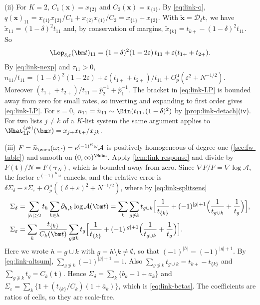 (ii) For $K=2$, $C_1(\bm x)=x_{\{2\}}$ and $C_2(\bm x)=x_{\{1\}}$. By \eqref{eq:link-q}, $q(\bm x)_{11}=x_{\{1\}}x_{\{2\}}/C_1+x_{\{2\}}x_{\{1\}}/C_2=x_{\{1\}}+x_{\{2\}}$. With $\tilde{\bm x}=\mathcal D_\delta\bm t$, we have $\tilde x_{11}=(1-\delta)^2t_{11}$ and, by conservation of margins, $\tilde x_{\{k\}}=t_{k+}-(1-\delta)^2t_{11}$. So
\[
  \Lop_{\delta,\varepsilon}(\bm t)_{11}=(1-\delta)^2(1-2\varepsilon)\,t_{11}+\varepsilon(t_{1+}+t_{2+}).
\]
By \eqref{eq:link-nexp} and $\tau_{11}>0$, $n_{11}/t_{11}=(1-\delta)^2(1-2\varepsilon)+\varepsilon(t_{1+}+t_{2+})/t_{11}+O_p^{\mathrm u}(\varepsilon^2+N^{-1/2})$. Moreover $(t_{1+}+t_{2+})/t_{11}=\hat p_2^{-1}+\hat p_1^{-1}$. The bracket in \eqref{eq:link-LP} is bounded away from zero for small rates, so inverting and expanding to first order gives \eqref{eq:link-LP}. For $\varepsilon=0$, $n_{11}=\tilde n_{11}\sim\Bin(t_{11},(1-\delta)^2)$ by \cref{prop:link-detach}(iv). For two lists $j\ne k$ of a $K$-list system the same argument applies to $\Nhat^{(jk)}_{\mathrm{LP}}(\bm x)=x_{j+}x_{k+}/x_{jk}$.

(iii) $F=\widehat n_{\zero}(\omega;\cdot)=e^{(-1)^K\omega}\mathcal A$ is positively homogeneous of degree one (\cref{sec:fw-table}) and smooth on $(0,\infty)^{\Hobs}$. Apply \cref{lem:link-response} and divide by $F(\bm t)/N=F(\bm\tau_N)$, which is bounded away from zero. Since $\nabla F/F=\nabla\log\mathcal A$, the factor $e^{(-1)^K\omega}$ cancels, and the relative error is $\delta\Sigma_\delta-\varepsilon\Sigma_\varepsilon+O_p^{\mathrm u}((\delta+\varepsilon)^2+N^{-1/2})$, where by \eqref{eq:link-splitsens}
\begin{align*}
  \Sigma_\delta&=\sum_{|h|\ge2}t_h\sum_{k\in h}\partial_{h,k}\log\mathcal A(\bm t)
  =\sum_k\sum_{g\not\ni k}t_{g\cup k}\Bigl[\frac1{t_{\{k\}}}+(-1)^{|g|+1}\Bigl(\frac1{t_{g\cup k}}+\frac1{t_g}\Bigr)\Bigr],\\
  \Sigma_\varepsilon&=\sum_k\frac{t_{\{k\}}}{C_k(\bm t)}\sum_{g\not\ni k}t_g\Bigl[\frac1{t_{\{k\}}}+(-1)^{|g|+1}\Bigl(\frac1{t_{g\cup k}}+\frac1{t_g}\Bigr)\Bigr].
\end{align*}
Here we wrote $h=g\cup k$ with $g=h\setminus k\ne\emptyset$, so that $(-1)^{|h|}=(-1)^{|g|+1}$. By \eqref{eq:link-altsum}, $\sum_{g\not\ni k}(-1)^{|g|+1}=1$. Also $\sum_{g\not\ni k}t_{g\cup k}=t_{k+}-t_{\{k\}}$ and $\sum_{g\not\ni k}t_g=C_k(\bm t)$. Hence $\Sigma_\delta=\sum_k\{b_k+1+a_k\}$ and $\Sigma_\varepsilon=\sum_k\{1+(t_{\{k\}}/C_k)(1+\bar a_k)\}$, which is \eqref{eq:link-betas}. The coefficients are ratios of cells, so they are scale-free.

